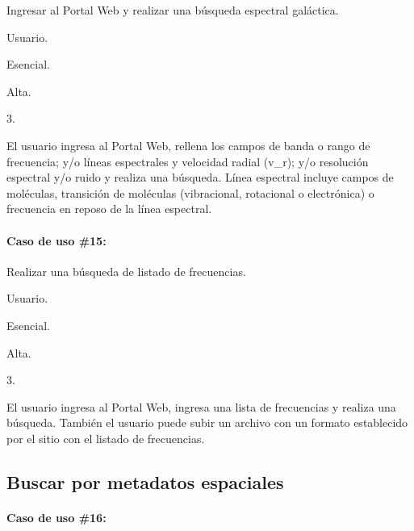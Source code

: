 \begin{description}[noitemsep]
        \item[Objetivo] Ingresar al Portal Web y realizar una búsqueda espectral galáctica.
        \item[Actor] Usuario.
        \item[Necesidad] Esencial.
        \item[Prioridad] Alta.
        \item[Requerimientos Referenciados] 3.
        \item[Descripción] El usuario ingresa al Portal Web, rellena los campos de banda o rango de frecuencia;  y/o líneas espectrales y velocidad radial (v\_r); y/o resolución espectral y/o ruido y realiza una búsqueda.  Línea espectral incluye campos de moléculas, transición de moléculas (vibracional, rotacional o electrónica) o frecuencia en reposo de la línea espectral.
\end{description}

\paragraph{Caso de uso \#15:}

\begin{description}[noitemsep]
        \item[Objetivo] Realizar una búsqueda de listado de frecuencias.
        \item[Actor] Usuario.
        \item[Necesidad] Esencial.
        \item[Prioridad] Alta.
        \item[Requerimientos Referenciados] 3.
        \item[Descripción] El usuario ingresa al Portal Web, ingresa una lista de frecuencias y realiza una búsqueda. También el usuario puede subir un archivo con un formato establecido por el sitio con el listado de frecuencias.
\end{description}


\subsection*{Buscar por metadatos espaciales}

\paragraph{Caso de uso \#16:}

